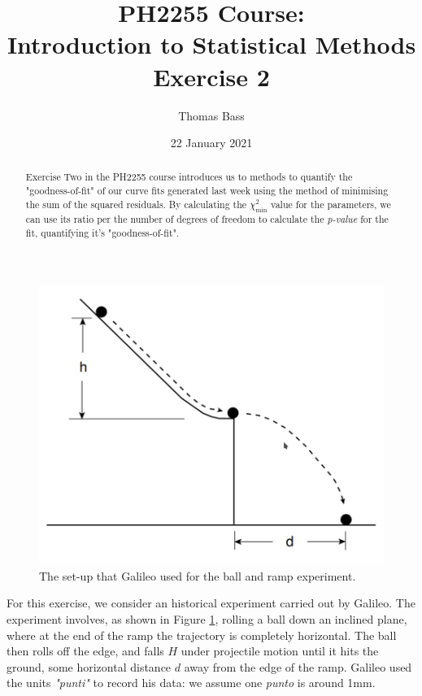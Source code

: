 \documentclass[a4paper]{article}
\title{PH2255 Course:\\
Introduction to Statistical Methods\\Exercise 2}
\author{Thomas Bass}
\date{22 January 2021}
\begin{document}
\maketitle

\begin{abstract}
Exercise Two in the PH2255 course introduces us to methods to quantify the "goodness-of-fit" of our curve fits generated last week using the method of minimising the sum of the squared residuals. By calculating the $\chi^2_\text{min}$ value for the parameters, we can use its ratio per the number of degrees of freedom to calculate the {\it p-value} for the fit, quantifying it's "goodness-of-fit".
\end{abstract}

\begin{figure}[b!]
\centerline{\includegraphics[scale=0.3]{experiment.png}}
\caption{The set-up that Galileo used for the ball and ramp experiment.}
\label{fig:experiment}
\end{figure}

For this exercise, we consider an historical experiment carried out by Galileo. The experiment involves, as shown in Figure \ref{fig:experiment}, rolling a ball down an inclined plane, where at the end of the ramp the trajectory is completely horizontal. The ball then rolls off the edge, and falls $H$ under projectile motion until it hits the ground, some horizontal distance $d$ away from the edge of the ramp. Galileo used the units {\it "punti"} to record his data: we assume one {\it punto} is around 1mm.
\end{document}
